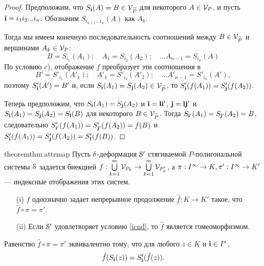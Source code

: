 \begin{proof}
Предположим, что $S_{\bf{i}}(A)=B\in {\mathcal V}_{\widetilde P}$ для некоторого $A\in {\mathcal V}_P$, и пусть ${\bf{i}}=i_1i_2...i_n$. 
Обозначим $S_{i_{k+1}...i_n}(A)$ как $A_k$.

Тогда мы имеем конечную последовательность соотношений между $B\in {\mathcal V}_{\widetilde P}$ и вершинами $A_k\in{\mathcal V}_P$:\\
\begin{equation}\label{chn1}
B=S_{i_1}(A_1); \quad A_1=S_{i_2}(A_2); \quad \ldots A_{n-1}=S_{i_n}(A)
\end{equation}
По условию c),  отображение $f$ преобразует  эти соотношения  в  
\begin{equation}\label{chn2} 
B'=S'_{i_1}(A'_1); \quad A'_1=S'_{i_2}(A'_2); \quad \ldots  A'_{n-1}=S'_{i_n}(A'), 
\end{equation}
поэтому $S'_{\bf{i}}(A')=B'$ и, если $S_{\bf{i}}(A_1)=S_{\bf{j}}(A_2)\in {\mathcal V}_{{\widetilde P}}$, то $S'_{\bf{i}}(f(A_1))=S'_{\bf{j}}(f(A_2))$.

Теперь предположим,  что $S_{\bf{i}}(A_1)=S_{\bf{j}}(A_2)$ и ${\bf{i}}={\bf{l}}{\bf{i}}'$, ${\bf{j}}={\bf{l}}{\bf{j}}'$ и $S_{\bf{i}}(A_1)=S_{\bf{j}}(A_2)=S_{\bf{l}}(B)$ для некоторого $B\in {\mathcal V}_{\widetilde P}$. 
Тогда  $S_{{\bf{i}}'}(A_1)=S_{{\bf{j}}'}(A_2)=B$, следовательно $S'_{{\bf{i}}'}(f(A_1))=S'_{{\bf{j}}'}(f(A_2))=f(B)$ и
$S'_{{\bf{i}}}(f(A_1))=S'_{{\bf{j}}}(f(A_2))=S'_{\bf{l}}(f(B))$.
\end{proof}

\begin{restatethis}{theorem}{thm:attrmap}\label{thm:attrmap}
Пусть  $\delta$-деформация ${\EuScript S}'$ стягиваемой $P$-полигональной системы ${\EuScript S}$ задается биекцией $f:\bigcup\limits_{k=1}^m {\mathcal V}_{P_k}\to \bigcup\limits_{k=1}^m {\mathcal V}_{P'_k}$, а $\pi:I^\infty\to K, \pi':I^\infty\to K'$ --- индексные отображения этих систем.
\begin{itemize}[nolistsep]
    \item[(i)] $f$ однозначно задает непрерывное продолжение $\hat f:K\to K'$ такое, что $\hat f\circ\pi=\pi'$.
    \item[(ii)] Если ${\EuScript S}'$ удовлетворяет условию \eqref{icnd}, то $\hat f$ является гомеоморфизмом.
\end{itemize}    
\end{restatethis}

\begin{remark}
Равенство  $\hat f\circ\pi=\pi'$ эквивалентно тому, что для любого $z\in K$ и ${\bf{i}}\in I^*$,
\begin{equation}\label{compat}
\hat f(S_{\bf{i}}(z))=S'_{\bf{i}}(\hat f(z)).
\end{equation}
\end{remark}

